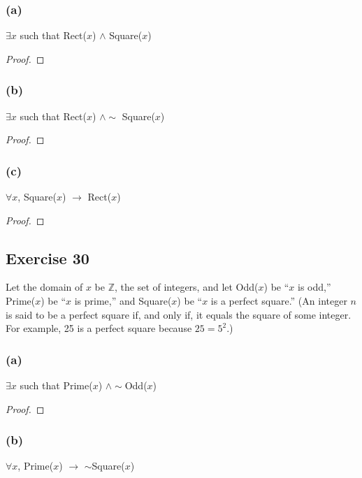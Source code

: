 \documentclass[14pt]{extarticle}
\newcommand{\Z}{\mathbb{Z}}
\newcommand{\fa}{\forall}
\newcommand{\te}{\exists}
\begin{document}
\subsubsection{(a)}
$\te x$ such that Rect($x$) $\wedge$ Square($x$)

\begin{proof}

\end{proof}

\subsubsection{(b)}
$\te x$ such that Rect($x$) $\wedge \sim$ Square($x$)

\begin{proof}

\end{proof}

\subsubsection{(c)}
$\fa x$, Square($x$) $\to$ Rect($x$)

\begin{proof}

\end{proof}

\subsection{Exercise 30}
Let the domain of $x$ be $\Z$, the set of integers, and let Odd($x$) be “$x$ is odd,” Prime($x$) be “$x$ is prime,” and Square($x$) be “$x$ is a perfect square.” (An integer $n$ is said to be a perfect square if, and only if, it equals the square of some integer. For example, 25 is a perfect square because $25 = 5^2$.)

\subsubsection{(a)}
$\te x$ such that Prime($x$) $\wedge\sim$Odd($x$)

\begin{proof}

\end{proof}

\subsubsection{(b)}
$\fa x$, Prime($x$) $\to$ $\sim$Square($x$)
\end{document}
